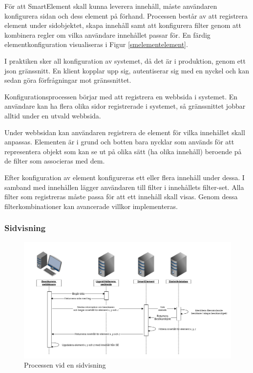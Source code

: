 För att SmartElement skall kunna leverera innehåll, måste användaren konfigurera sidan och dess element på förhand. Processen består av att registrera element under sidobjektet, skapa innehåll samt att konfigurera filter genom att kombinera regler om vilka användare innehållet passar för. En färdig elementkonfiguration visualiseras i Figur \ref{smelementelement}.

I praktiken sker all konfiguration av systemet, då det är i produktion, genom ett \gls{json} gränssnitt. En klient kopplar upp sig, autentiserar sig med en nyckel och kan sedan göra förfrågningar mot gränssnittet.

Konfigurationsprocessen börjar med att registrera en webbsida i systemet. En användare kan ha flera olika sidor registrerade i systemet, så gränssnittet jobbar alltid under en utvald webbsida.

Under webbsidan kan användaren registrera de element för vilka innehållet skall anpassas. Elementen är i grund och botten bara nycklar som används för att representera objekt som kan se ut på olika sätt (ha olika innehåll) beroende på de filter som associeras med dem.

Efter konfiguration av element konfigureras ett eller flera innehåll under dessa. I samband med innehållen lägger användaren till filter i innehållets filter-set. Alla filter som registreras måste passa för att ett innehåll skall visas. Genom dessa filterkombinationer kan avancerade villkor implementeras.

\subsubsection{Sidvisning}

\begin{figure}[h!]
\centering
\includegraphics[width=150mm]{assets/images/smelementactivity.png}
\caption{Processen vid en sidvisning}
\label{pageviewprocess}
\end{figure}

